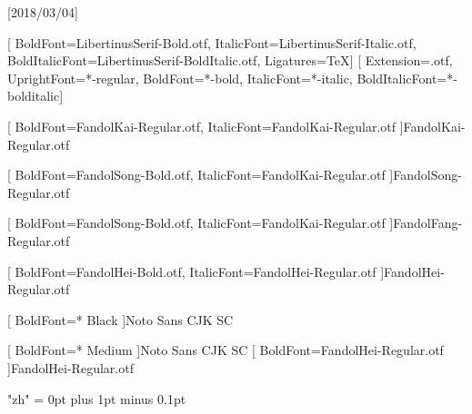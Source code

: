 
[2018/03/04]

\setmainfont{LibertinusSerif-Regular.otf}[
  BoldFont=LibertinusSerif-Bold.otf,
  ItalicFont=LibertinusSerif-Italic.otf,
  BoldItalicFont=LibertinusSerif-BoldItalic.otf,
  Ligatures=TeX]
\setsansfont{texgyreheros}[     %
Extension=.otf,
UprightFont=*-regular,
BoldFont=*-bold,
ItalicFont=*-italic,
BoldItalicFont=*-bolditalic]





[
	BoldFont=FandolKai-Regular.otf, ItalicFont=FandolKai-Regular.otf
]{FandolKai-Regular.otf}

[
	BoldFont=FandolSong-Bold.otf,
	ItalicFont=FandolKai-Regular.otf
]{FandolSong-Regular.otf}

[
	BoldFont=FandolSong-Bold.otf,
	ItalicFont=FandolKai-Regular.otf
]{FandolFang-Regular.otf}

[
	BoldFont=FandolHei-Bold.otf,
	ItalicFont=FandolHei-Regular.otf
]{FandolHei-Regular.otf}


[
	BoldFont=* Black
]{Noto Sans CJK SC}

[
	BoldFont=* Medium
]{Noto Sans CJK SC}	%
[
	BoldFont=FandolHei-Regular.otf
]{FandolHei-Regular.otf}	%

\XeTeXlinebreaklocale "zh"
\XeTeXlinebreakskip = 0pt plus 1pt minus 0.1pt

\newcommand\kaishu{\CJKfamily{kai}} %
\newcommand\songti{\CJKfamily{song}} %
\newcommand\heiti{\CJKfamily{hei}}	%
\newcommand\thmheiti{\CJKfamily{hei2}}	%
\newcommand\fangsong{\CJKfamily{fangsong}} %
\renewcommand{\em}{\bfseries\CJKfamily{emfont}} %
